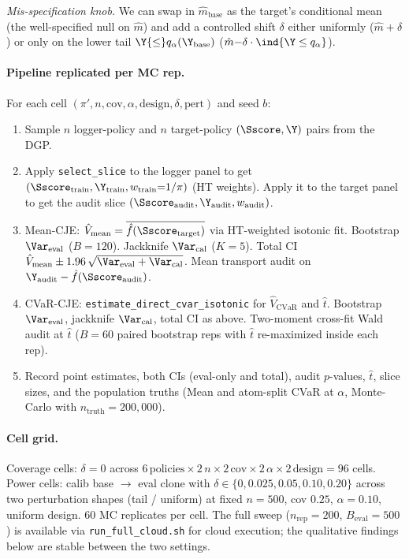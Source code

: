 \textit{Mis-specification knob.} We can swap in $\hat m_{\text{base}}$ as the
target's conditional mean (the well-specified null on $\hat m$) and add a
controlled shift $\delta$ either uniformly ($\hat m{+}\delta$) or only on
the lower tail $\Y{\le}q_{\alpha}(\Y_{\text{base}})$
($\hat m{-}\delta\cdot\ind{\Y\le q_\alpha}$).

\paragraph{Pipeline replicated per MC rep.}
For each cell $(\pi', n, \text{cov}, \alpha, \text{design}, \delta, \text{pert})$ and seed $b$:
\begin{enumerate}[leftmargin=*,nosep]
  \item Sample $n$ logger-policy and $n$ target-policy $(\Sscore, \Y)$ pairs from the DGP.
  \item Apply \texttt{select\_slice} to the logger panel to get
    $(\Sscore_{\text{train}}, \Y_{\text{train}}, w_{\text{train}}{=}1/\pi)$
    (HT weights). Apply it to the target panel to get the audit slice
    $(\Sscore_{\text{audit}}, \Y_{\text{audit}}, w_{\text{audit}})$.
  \item Mean-CJE: $\hat V_{\text{mean}} = \overline{\hat f(\Sscore_{\text{target}})}$
    via HT-weighted isotonic fit. Bootstrap $\Var_{\text{eval}}$ ($B{=}120$).
    Jackknife $\Var_{\text{cal}}$ ($K{=}5$). Total CI
    $\hat V_{\text{mean}} \pm 1.96\,\sqrt{\Var_{\text{eval}} + \Var_{\text{cal}}}$.
    Mean transport audit on $\Y_{\text{audit}} - \hat f(\Sscore_{\text{audit}})$.
  \item CVaR-CJE: \texttt{estimate\_direct\_cvar\_isotonic} for $\hat V_{\text{CVaR}}$ and $\hat t$.
    Bootstrap $\Var_{\text{eval}}$, jackknife $\Var_{\text{cal}}$, total CI as above.
    Two-moment cross-fit Wald audit at $\hat t$ ($B{=}60$ paired bootstrap reps with
    $\hat t$ re-maximized inside each rep).
  \item Record point estimates, both CIs (eval-only and total), audit
    $p$-values, $\hat t$, slice sizes, and the population truths
    (Mean and atom-split CVaR at $\alpha$, Monte-Carlo with $n_{\text{truth}} = 200{,}000$).
\end{enumerate}

\paragraph{Cell grid.} Coverage cells: $\delta{=}0$ across $6\,\text{policies} \times 2\,n \times 2\,\text{cov} \times 2\,\alpha \times 2\,\text{design} = 96$ cells. Power cells: calib base $\to$ eval clone with $\delta \in \{0, 0.025, 0.05, 0.10, 0.20\}$ across two perturbation shapes (tail / uniform) at fixed $n{=}500$, cov $0.25$, $\alpha{=}0.10$, uniform design. 60 MC replicates per cell. The full sweep ($n_{\text{rep}}{=}200$, $B_{\text{eval}}{=}500$) is available via \texttt{run\_full\_cloud.sh} for cloud execution; the qualitative findings below are stable between the two settings.

